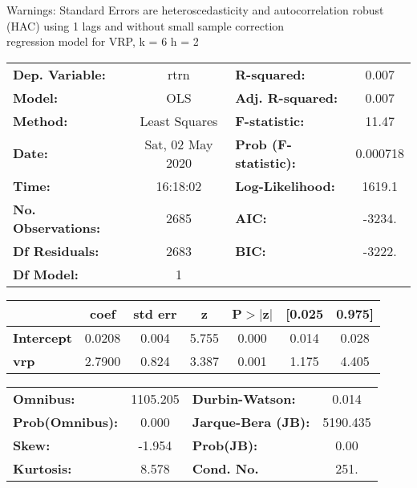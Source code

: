 Warnings: \newline
 [1] Standard Errors are heteroscedasticity and autocorrelation robust (HAC) using 1 lags and without small sample correction\\ 

regression model for VRP, k = 6 h = 2\begin{center}
\begin{tabular}{lclc}
\toprule
\textbf{Dep. Variable:}    &       rtrn       & \textbf{  R-squared:         } &     0.007   \\
\textbf{Model:}            &       OLS        & \textbf{  Adj. R-squared:    } &     0.007   \\
\textbf{Method:}           &  Least Squares   & \textbf{  F-statistic:       } &     11.47   \\
\textbf{Date:}             & Sat, 02 May 2020 & \textbf{  Prob (F-statistic):} &  0.000718   \\
\textbf{Time:}             &     16:18:02     & \textbf{  Log-Likelihood:    } &    1619.1   \\
\textbf{No. Observations:} &        2685      & \textbf{  AIC:               } &    -3234.   \\
\textbf{Df Residuals:}     &        2683      & \textbf{  BIC:               } &    -3222.   \\
\textbf{Df Model:}         &           1      & \textbf{                     } &             \\
\bottomrule
\end{tabular}
\begin{tabular}{lcccccc}
                   & \textbf{coef} & \textbf{std err} & \textbf{z} & \textbf{P$> |$z$|$} & \textbf{[0.025} & \textbf{0.975]}  \\
\midrule
\textbf{Intercept} &       0.0208  &        0.004     &     5.755  &         0.000        &        0.014    &        0.028     \\
\textbf{vrp}       &       2.7900  &        0.824     &     3.387  &         0.001        &        1.175    &        4.405     \\
\bottomrule
\end{tabular}
\begin{tabular}{lclc}
\textbf{Omnibus:}       & 1105.205 & \textbf{  Durbin-Watson:     } &    0.014  \\
\textbf{Prob(Omnibus):} &   0.000  & \textbf{  Jarque-Bera (JB):  } & 5190.435  \\
\textbf{Skew:}          &  -1.954  & \textbf{  Prob(JB):          } &     0.00  \\
\textbf{Kurtosis:}      &   8.578  & \textbf{  Cond. No.          } &     251.  \\
\bottomrule
\end{tabular}
\end{center}

